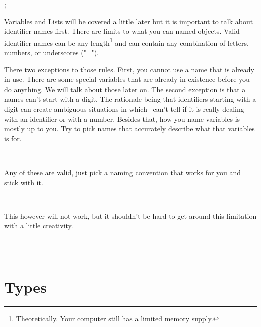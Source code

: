 \begin{SSCodeBox}
;
\end{SSCodeBox}

Variables and Lists will be covered a little later but it is important to talk about identifier names first.  There are limits to what you can named objects. Valid identifier names can be any length\footnote{Theoretically.  Your computer still has a limited memory supply.} and can contain any combination of letters, numbers, or underscores ("\_").  

There two exceptions to those rules. First, you cannot use a name that is already in use.  There are some special variables that are already in existence before you do anything.  We will talk about those later on.  The second exception is that a names can't start with a digit.  The rationale being that identifiers starting with a digit can create ambiguous situations in which \SSquared\ can't tell if it is really dealing with an identifier or with a number.  Besides that, how you name variables is mostly up to you.  Try to pick names that accurately describe what that variables is for.

\begin{SSCodeBox}
 \\
\end{SSCodeBox}

Any of these are valid, just pick a naming convention that works for you and stick with it.

\begin{SSCodeBox}
  \\
\end{SSCodeBox}

This however will not work, but it shouldn't be hard to get around this limitation with a little creativity.

\begin{SSCodeBox}
  \\
  \\
\end{SSCodeBox}




%
%
\chapter{Types}

